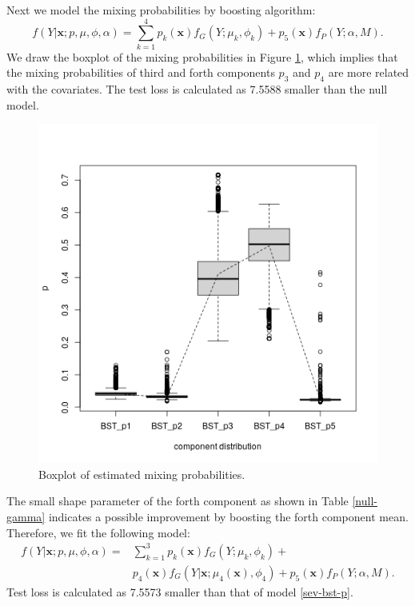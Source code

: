 \documentclass[11pt]{article}
\numberwithin{equation}{section}
\def\bx{\boldsymbol{x}}
\begin{document}
Next we model the mixing probabilities by boosting algorithm:
\begin{equation}\label{sev-bst-p}
f(Y|\bx;p,\mu,\phi,\alpha)=\sum_{k=1}^4p_k(\bx)f_{G}(Y;\mu_k,\phi_k)+p_5(\bx)f_{P}(Y;\alpha,M).
\end{equation}
We draw the boxplot of the mixing probabilities in Figure \ref{bx-bst-p}, which implies that the mixing probabilities of third and forth components $p_3$ and $p_4$ are more related with the covariates.
The test loss is calculated as 7.5588 smaller than the null model.
	\begin{figure}[htp!]
		\centering
		\includegraphics[width=0.35\linewidth]{../plots/sev/bst_p}
		\caption{Boxplot of estimated mixing probabilities.}\label{bx-bst-p}
	\end{figure}


The small shape parameter of the forth component as shown in Table \ref{null-gamma} indicates a possible improvement by boosting the forth component  mean.
Therefore, we fit the following model:
	$$
	\begin{aligned}
		f(Y|\bx;p,\mu,\phi,\alpha)=&\sum_{k=1}^3p_k(\bx)f_{G}(Y;\mu_k,\phi_k)+ \\
		&p_4(\bx)f_{G}(Y|\bx;\mu_4(\bx),\phi_4)+ p_5(\bx)f_{P}(Y;\alpha,M).
	\end{aligned}
	$$
	Test loss is calculated as 7.5573 smaller than that of model \eqref{sev-bst-p}. 
\end{document}
